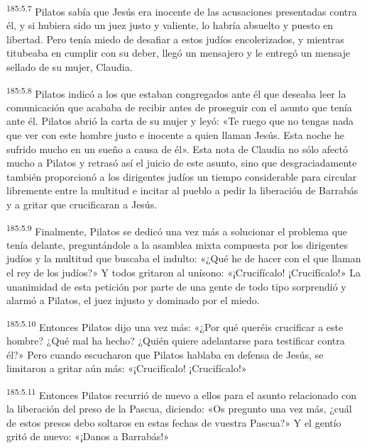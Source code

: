 \par 
\textsuperscript{185:5.7} Pilatos sabía que Jesús era inocente de las acusaciones presentadas contra él, y si hubiera sido un juez justo y valiente, lo habría absuelto y puesto en libertad. Pero tenía miedo de desafiar a estos judíos encolerizados, y mientras titubeaba en cumplir con su deber, llegó un mensajero y le entregó un mensaje sellado de su mujer, Claudia.

\par 
\textsuperscript{185:5.8} Pilatos indicó a los que estaban congregados ante él que deseaba leer la comunicación que acababa de recibir antes de proseguir con el asunto que tenía ante él. Pilatos abrió la carta de su mujer y leyó: «Te ruego que no tengas nada que ver con este hombre justo e inocente a quien llaman Jesús. Esta noche he sufrido mucho en un sueño a causa de él». Esta nota de Claudia no sólo afectó mucho a Pilatos y retrasó así el juicio de este asunto, sino que desgraciadamente también proporcionó a los dirigentes judíos un tiempo considerable para circular libremente entre la multitud e incitar al pueblo a pedir la liberación de Barrabás y a gritar que crucificaran a Jesús.

\par 
\textsuperscript{185:5.9} Finalmente, Pilatos se dedicó una vez más a solucionar el problema que tenía delante, preguntándole a la asamblea mixta compuesta por los dirigentes judíos y la multitud que buscaba el indulto: «¿Qué he de hacer con el que llaman el rey de los judíos?» Y todos gritaron al unísono: «¡Crucifícalo! ¡Crucifícalo!» La unanimidad de esta petición por parte de una gente de todo tipo sorprendió y alarmó a Pilatos, el juez injusto y dominado por el miedo.

\par 
\textsuperscript{185:5.10} Entonces Pilatos dijo una vez más: «¿Por qué queréis crucificar a este hombre? ¿Qué mal ha hecho? ¿Quién quiere adelantarse para testificar contra él?» Pero cuando escucharon que Pilatos hablaba en defensa de Jesús, se limitaron a gritar aún más: «¡Crucifícalo! ¡Crucifícalo!»

\par 
\textsuperscript{185:5.11} Entonces Pilatos recurrió de nuevo a ellos para el asunto relacionado con la liberación del preso de la Pascua, diciendo: «Os pregunto una vez más, ¿cuál de estos presos debo soltaros en estas fechas de vuestra Pascua?» Y el gentío gritó de nuevo: «¡Danos a Barrabás!»

